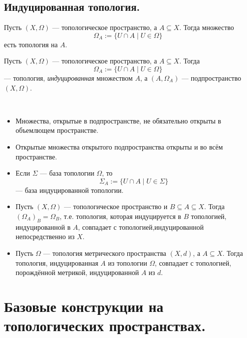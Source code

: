 \documentclass[12pt,a4paper]{article}
\begin{document}
    \subsection{Индуцированная топология.}

    \begin{theorem}
        Пусть $(X, \Omega)$ --- топологическое пространство, а $A \subseteq X$. Тогда множество
        \[\Omega_A := \{U \cap A \mid U \in \Omega\}\]
        есть топология на $A$.
    \end{theorem}

    \begin{definition}
        Пусть $(X, \Omega)$ --- топологическое пространство, а $A \subseteq X$. Тогда
        \[\Omega_A := \{U \cap A \mid U \in \Omega\}\]
        --- топология, \emph{индуцированная} множеством $A$, а $(A, \Omega_A)$ --- подпространство $(X, \Omega)$.
    \end{definition}

    \begin{theorem}\ 
        \begin{itemize}
            \item Множества, открытые в подпространстве, не обязательно открыты в объемлющем пространстве.
            \item Открытые множества открытого подпространства открыты и во всём пространстве.
            \item Если $\Sigma$ --- база топологии $\Omega$, то
                \[\Sigma_A := \{U \cap A \mid U \in \Sigma\}\]
                --- база индуцированной топологии.
            \item Пусть $(X, \Omega)$ --- топологическое пространство и $B \subseteq A \subseteq X$. Тогда $(\Omega_A)_B = \Omega_B$, т.е. топология, которая индуцируется в $B$ топологией, индуцированной в $A$, совпадает с топологией,индуцированной непосредственно из $X$.
            \item Пусть $\Omega$ --- топология метрического пространства $(X, d)$, а $A \subseteq X$. Тогда топология, индуцированная $A$ из топологии $\Omega$, совпадает с топологией, порождённой метрикой, индуцированной $A$ из $d$.
        \end{itemize}
    \end{theorem}

    \section{Базовые конструкции на топологических пространствах.}
\end{document}
